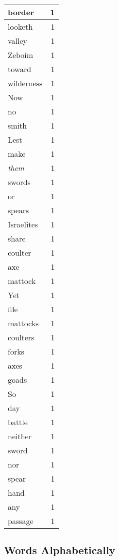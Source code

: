 \begin{center}
\begin{longtable}{l|r}
border & 1 \\ \hline
looketh & 1 \\ \hline
valley & 1 \\ \hline
Zeboim & 1 \\ \hline
toward & 1 \\ \hline
wilderness & 1 \\ \hline
Now & 1 \\ \hline
no & 1 \\ \hline
smith & 1 \\ \hline
Lest & 1 \\ \hline
make & 1 \\ \hline
\emph{them} & 1 \\ \hline
swords & 1 \\ \hline
or & 1 \\ \hline
spears & 1 \\ \hline
Israelites & 1 \\ \hline
share & 1 \\ \hline
coulter & 1 \\ \hline
axe & 1 \\ \hline
mattock & 1 \\ \hline
Yet & 1 \\ \hline
file & 1 \\ \hline
mattocks & 1 \\ \hline
coulters & 1 \\ \hline
forks & 1 \\ \hline
axes & 1 \\ \hline
goads & 1 \\ \hline
So & 1 \\ \hline
day & 1 \\ \hline
battle & 1 \\ \hline
neither & 1 \\ \hline
sword & 1 \\ \hline
nor & 1 \\ \hline
spear & 1 \\ \hline
hand & 1 \\ \hline
any & 1 \\ \hline
passage & 1 \\ \hline
\end{longtable}
\end{center}



\normalsize



\subsection{Words Alphabetically}

